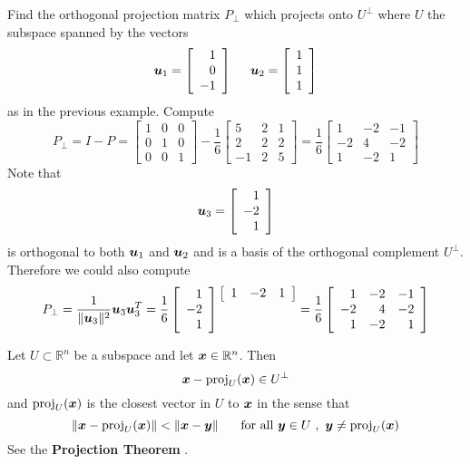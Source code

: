 \begin{example}
Find the orthogonal projection matrix $P_{\perp}$ which projects onto $U^{\perp}$ where $U$ the subspace spanned by the vectors
$$
\boldsymbol{u}_1 = \left[ \begin{array}{r} 1 \\ 0 \\ -1 \end{array} \right]
\hspace{5mm}
\boldsymbol{u}_2 = \left[ \begin{array}{r} 1 \\ 1 \\ 1 \end{array} \right]
$$
as in the previous example. Compute
$$
P_{\perp} = I - P =
\left[ \begin{array}{rrr} 1 & 0 & 0 \\ 0 & 1 & 0 \\ 0 & 0 & 1 \end{array} \right] - 
\frac{1}{6} \left[ \begin{array}{rrr} 5 & 2 & 1 \\ 2 & 2 & 2 \\ -1 & 2 & 5 \end{array} \right]
=
\frac{1}{6} \left[ \begin{array}{rrr} 1 & -2 & -1 \\ -2 & 4 & -2 \\ 1 & -2 & 1 \end{array} \right]
$$
Note that
$$
\boldsymbol{u}_3 = \left[ \begin{array}{r} 1 \\ -2 \\ 1 \end{array} \right]
$$
is orthogonal to both $\boldsymbol{u}_1$ and $\boldsymbol{u}_2$ and is a basis of the orthogonal complement $U^{\perp}$. Therefore we could also compute
$$
P_{\perp} = \frac{1}{\| \bs{u}_3 \|^2} \bs{u}_3 \bs{u}_3^T =
\frac{1}{6} \left[ \begin{array}{r} 1 \\ -2 \\ 1 \end{array} \right]
\raisebox{4.5mm}{$\left[ \begin{array}{ccc} 1 & -2 & 1 \end{array} \right]$}
= \frac{1}{6} \left[ \begin{array}{rrr} 1 & -2 & -1 \\ -2 & 4 & -2 \\ 1 & -2 & 1 \end{array} \right]
$$
\end{example}

\begin{theorem}
Let $U \subset \mathbb{R}^n$ be a subspace and let $\boldsymbol{x} \in \mathbb{R}^n$. Then
$$
\boldsymbol{x} - \mathrm{proj}_U(\boldsymbol{x}) \in U^{\perp}
$$
and $\mathrm{proj}_U(\boldsymbol{x})$ is the closest vector in $U$ to $\boldsymbol{x}$ in the sense that
$$
\| \bs{x} - \mathrm{proj}_U(\bs{x}) \| < \| \bs{x} - \bs{y} \| \hspace{5mm} \text{ for all } \bs{y} \in U \ , \ \bs{y} \not= \mathrm{proj}_U(\bs{x})
$$
See the {\bf Projection Theorem} \cite[p.420]{KN}.
\end{theorem}


